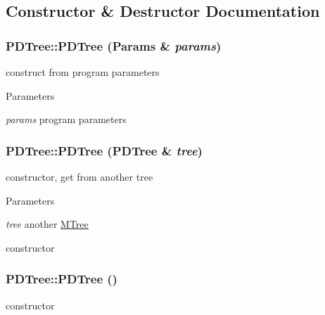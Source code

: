 \subsection{Constructor \& Destructor Documentation}
\hypertarget{classPDTree_a3561a63dd0ff1df68e0705bd3a734802}{
\subsubsection[{PDTree}]{\setlength{\rightskip}{0pt plus 5cm}PDTree::PDTree ({\bf Params} \& {\em params})}}
\label{classPDTree_a3561a63dd0ff1df68e0705bd3a734802}
construct from program parameters 
\begin{DoxyParams}{Parameters}
\item[{\em params}]program parameters \end{DoxyParams}
\hypertarget{classPDTree_aabcb230432131fcf1a626497582136b7}{
\subsubsection[{PDTree}]{\setlength{\rightskip}{0pt plus 5cm}PDTree::PDTree ({\bf PDTree} \& {\em tree})}}
\label{classPDTree_aabcb230432131fcf1a626497582136b7}
constructor, get from another tree 
\begin{DoxyParams}{Parameters}
\item[{\em tree}]another \hyperlink{classMTree}{MTree}\end{DoxyParams}
constructor \hypertarget{classPDTree_afbd93cea8f1f5d76f1b5f5130bf0933f}{
\subsubsection[{PDTree}]{\setlength{\rightskip}{0pt plus 5cm}PDTree::PDTree ()}}
\label{classPDTree_afbd93cea8f1f5d76f1b5f5130bf0933f}
constructor 

